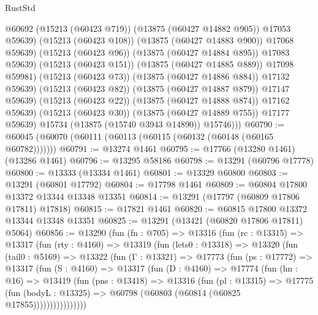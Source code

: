\begin{lexlean}{RustStd}
\begin{coremodule}
                          @60692
                          (@15213 (@60423 @719))
                          (@13875 (@60427 @14882 @905))
                          @17053
                          @59639)
                        (@15213 (@60423 @108))
                        (@13875 (@60427 @14883 @900))
                        @17068
                        @59639)
                      (@15213 (@60423 @96))
                      (@13875 (@60427 @14884 @895))
                      @17083
                      @59639)
                    (@15213 (@60423 @151))
                    (@13875 (@60427 @14885 @889))
                    @17098
                    @59981)
                  (@15213 (@60423 @73))
                  (@13875 (@60427 @14886 @884))
                  @17132
                  @59639)
                (@15213 (@60423 @82))
                (@13875 (@60427 @14887 @879))
                @17147
                @59639)
              (@15213 (@60423 @22))
              (@13875 (@60427 @14888 @874))
              @17162
              @59639)
            (@15213 (@60423 @30))
            (@13875 (@60427 @14889 @755))
            @17177
            @59639)
          @15734
          (@13875 (@15740 @3943 @14890))
          @15746)))
@60790 := @60045 (@60070 (@60111 (@60113 (@60115 (@60132 (@60148 (@60165 @60782)))))))
@60791 := @13274 @1461
@60795 := @17766 (@13280 @1461) (@13286 @1461)
@60796 := @13295 @58186
@60798 := @13291 (@60796 @17778)
@60800 := @13333 (@13334 @1461)
@60801 := @13329 @60800
@60803 := @13291 (@60801 @17792)
@60804 := @17798 @1461
@60809 := @60804 @17800 @13372 @13344 @13348 @13351
@60814 := @13291 (@17797 (@60809 @17806 @17811) @17818)
@60815 := @17821 @1461
@60820 := @60815 @17800 @13372 @13344 @13348 @13351
@60825 := @13291 (@13421 (@60820 @17806 @17811) @5064)
@60856 := @13290
    (fun (fn : @705) =>
    @13316
      (fun (rc : @13315) =>
      @13317
        (fun (rty : @4160) =>
        @13319
          (fun (lets0 : @13318) =>
          @13320
            (fun (tail0 : @5169) =>
            @13322
              (fun (Γ : @13321) =>
              @17773
                (fun (ps : @17772) =>
                @13317
                  (fun (S : @4160) =>
                  @13317
                    (fun (D : @4160) =>
                    @17774
                      (fun (hn : @16) =>
                      @13419
                        (fun (pns : @13418) =>
                        @13316
                          (fun (pl : @13315) =>
                          @17775
                            (fun (bodyL : @13325) =>
                            @60798 (@60803 (@60814 (@60825 @17855))))))))))))))))

\end{coremodule}
\end{lexlean}
